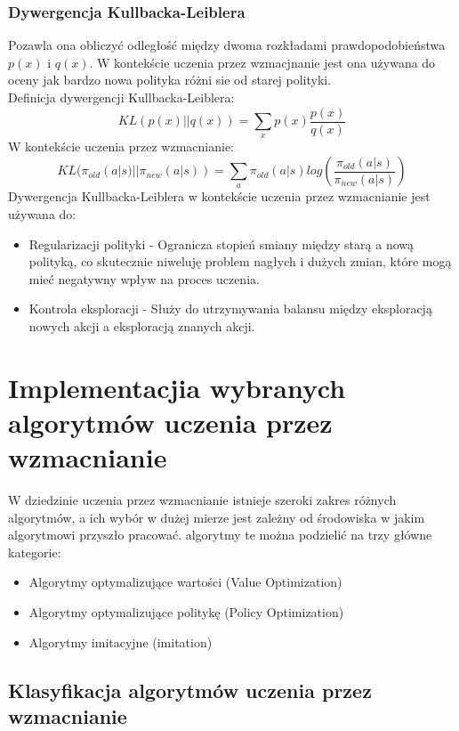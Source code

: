 \documentclass[a4paper, 10pt]{article}
\begin{document}
    \subsubsection{Dywergencja Kullbacka-Leiblera}
    Pozawla ona obliczyć odległość między dwoma rozkładami prawdopodobieństwa \( p(x) \) i \( q(x) \). W kontekście uczenia przez wzmacjnanie jest ona używana
    do oceny jak bardzo nowa polityka różni sie od starej polityki. 
    \\ Definicja dywergencji Kullbacka-Leiblera:
    \[ KL(p(x) || q(x)) = \sum_{x} p(x) \frac{p(x)}{q(x)}\]
    W kontekście uczenia przez wzmacnianie:
    \[ KL(\pi_{old}(a|s) || \pi_{new}(a|s)) = \sum_{a} \pi_{old}(a|s) log(\frac{\pi_{old}(a|s)}{\pi_{new}(a|s)})\]
    Dywergencja Kullbacka-Leiblera w kontekście uczenia przez wzmacnianie jest używana do:
    \begin{itemize}
        \item Regularizacji polityki - Ogranicza stopień smiany między starą a nową polityką, co skutecznie niweluję problem nagłych i dużych zmian,
        które mogą mieć negatywny wpływ na proces uczenia.
        \item Kontrola eksploracji - Służy do utrzymywania balansu między eksploracją nowych akcji a eksploracją znanych akcji.
    \end{itemize}
    \section{Implementacjia wybranych algorytmów uczenia przez wzmacnianie}
    W dziedzinie uczenia przez wzmacnianie istnieje szeroki zakres różnych algorytmów, a ich wybór w dużej mierze
    jest zależny od środowiska w jakim algorytmowi przyszło pracować. algorytmy te można podzielić na trzy główne kategorie:
    \begin{itemize}
        \item Algorytmy optymalizujące wartości (Value Optimization)
        \item Algorytmy optymalizujące politykę (Policy Optimization)
        \item Algorytmy imitacyjne (imitation)
    \end{itemize}
    \subsection{Klasyfikacja algorytmów uczenia przez wzmacnianie}
\end{document}
